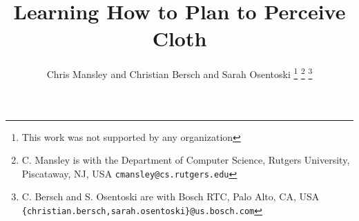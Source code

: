 \documentclass[a4paper, 10pt, conference]{ieeeconf}      %
\title{\LARGE \bf 
Learning How to Plan to Perceive Cloth
}
\author{Chris Mansley and Christian Bersch and Sarah Osentoski%
\thanks{This work was not supported by any organization}%
\thanks{C. Mansley is with the Department of Computer Science,
        Rutgers University, Piscataway, NJ, USA
        {\tt\small cmansley@cs.rutgers.edu}}%
\thanks{C. Bersch and S. Osentoski are with Bosch RTC,
        Palo Alto, CA, USA
        {\tt\small \{christian.bersch,sarah.osentoski\}@us.bosch.com}}%
}
\begin{document}
\maketitle
\thispagestyle{empty}
\pagestyle{empty}


\begin{abstract}

\end{abstract}









\end{document}
